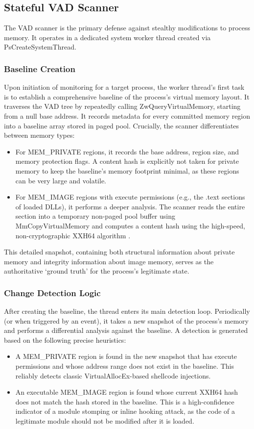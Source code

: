 \documentclass[journal]{IEEEtran}
\begin{document}
\subsection{Stateful VAD Scanner}
The VAD scanner is the primary defense against stealthy modifications to process memory. It operates in a dedicated system worker thread created via PsCreateSystemThread.
\subsubsection{Baseline Creation}
Upon initiation of monitoring for a target process, the worker thread's first task is to establish a comprehensive baseline of the process's virtual memory layout. It traverses the VAD tree by repeatedly calling ZwQueryVirtualMemory, starting from a null base address. It records metadata for every committed memory region into a baseline array stored in paged pool. Crucially, the scanner differentiates between memory types:
\begin{itemize}
\item For MEM\_PRIVATE regions, it records the base address, region size, and memory protection flags. A content hash is explicitly not taken for private memory to keep the baseline's memory footprint minimal, as these regions can be very large and volatile.
\item For MEM\_IMAGE regions with execute permissions (e.g., the .text sections of loaded DLLs), it performs a deeper analysis. The scanner reads the entire section into a temporary non-paged pool buffer using MmCopyVirtualMemory and computes a content hash using the high-speed, non-cryptographic XXH64 algorithm \cite{colletXXHash}.
\end{itemize}
This detailed snapshot, containing both structural information about private memory and integrity information about image memory, serves as the authoritative `ground truth' for the process's legitimate state.
\subsubsection{Change Detection Logic}
After creating the baseline, the thread enters its main detection loop. Periodically (or when triggered by an event), it takes a new snapshot of the process's memory and performs a differential analysis against the baseline. A detection is generated based on the following precise heuristics:
\begin{itemize}
\item  A MEM\_PRIVATE region is found in the new snapshot that has execute permissions and whose address range does not exist in the baseline. This reliably detects classic VirtualAllocEx-based shellcode injections.
\item An executable MEM\_IMAGE region is found whose current XXH64 hash does not match the hash stored in the baseline. This is a high-confidence indicator of a module stomping or inline hooking attack, as the code of a legitimate module should not be modified after it is loaded.
\end{itemize}
\end{document}
